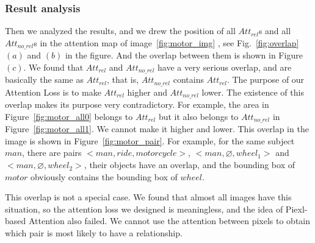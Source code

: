 \subsubsection{Result analysis}

Then we analyzed the results, and we drew the position of all $ Att_{rel} $s and all $ Att_{no\_rel} $s in the attention map of image~\ref{fig:motor_img} , see Fig.~\ref{fig:overlap} $ (a) $ and $ (b) $ in the figure. And the overlap between them is shown in Figure $ (c). $ We found that $ Att_{rel }$ and $ Att_{no\_rel} $ have a very serious overlap, and are basically the same as $ Att_{rel }$, that is,  $ Att_{no\_rel} $ contains $ Att_{rel }$. The purpose of our Attention Loss is to make $ Att_{rel }$ higher and $ Att_{no\_rel }$ lower. The existence of this overlap makes its purpose very contradictory. For example, the area in Figure~\ref{fig:motor_all0} belongs to $ Att_{rel }$ but it also belongs to $ Att_{no\_rel }$ in Figure~\ref{fig:motor_all1}. We cannot make it higher and lower. This overlap in the image is shown in Figure~\ref{fig:motor_pair}. For example, for the same subject $ man $, there are  pairs $<man,ride,motorcycle>$, $ <man, \varnothing, wheel_1> $  and  $ <man, \varnothing, wheel_2>  $, their objects have an overlap, and the bounding box  of $ motor $ obviously contains the bounding box of  $ wheel $.

This overlap is not a special case. We found that almost all images have this situation, so the attention loss we designed is meaningless, and the idea of Piexl-based Attention also failed. We cannot use the attention between pixels to obtain which pair is most likely to have a relationship.

